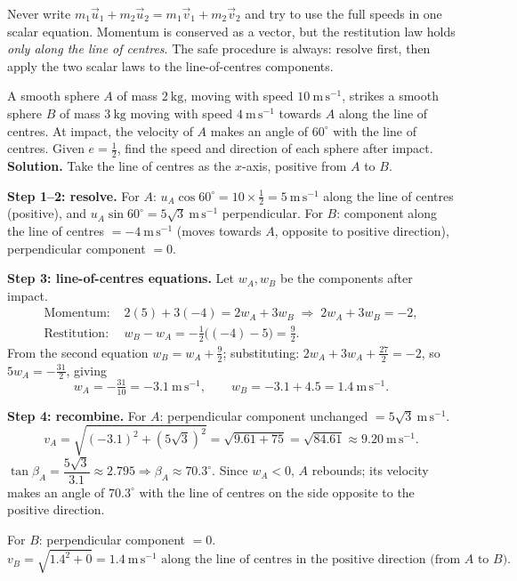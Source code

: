 \documentclass[11pt]{article}
\newcounter{popsec}
\newcounter{popsub}
\newcommand{\courssub}[1]{%
  \stepcounter{popsub}%
  \par\vspace{9pt}\noindent{\popxbold\fontsize{11.5}{13}\selectfont\color{popink}{\color{poporange}\thepopsec.\thepopsub}\hspace{6pt}#1}\par\nopagebreak\vspace{4pt}
}
\begin{document}
\begin{attention}
Never write $m_1\vec{u}_1 + m_2\vec{u}_2 = m_1\vec{v}_1 + m_2\vec{v}_2$ and try to use the full speeds in one scalar equation. Momentum is conserved as a vector, but the restitution law holds \emph{only along the line of centres}. The safe procedure is always: resolve first, then apply the two scalar laws to the line-of-centres components.
\end{attention}

\courssub{Worked Example (GCE Style)}

\begin{exoresolu}
A smooth sphere $A$ of mass $2\ \mathrm{kg}$, moving with speed $10\ \mathrm{m\,s^{-1}}$, strikes a smooth sphere $B$ of mass $3\ \mathrm{kg}$ moving with speed $4\ \mathrm{m\,s^{-1}}$ towards $A$ along the line of centres. At impact, the velocity of $A$ makes an angle of $60^{\circ}$ with the line of centres. Given $e = \tfrac{1}{2}$, find the speed and direction of each sphere after impact.
\tcblower
\textbf{Solution.} Take the line of centres as the $x$-axis, positive from $A$ to $B$.

\textbf{Step 1--2: resolve.} For $A$: $u_A\cos 60^{\circ} = 10 \times \tfrac12 = 5\ \mathrm{m\,s^{-1}}$ along the line of centres (positive), and $u_A\sin 60^{\circ} = 5\sqrt{3}\ \mathrm{m\,s^{-1}}$ perpendicular. For $B$: component along the line of centres $= -4\ \mathrm{m\,s^{-1}}$ (moves towards $A$, opposite to positive direction), perpendicular component $=0$.

\textbf{Step 3: line-of-centres equations.} Let $w_A, w_B$ be the components after impact.
\begin{align*}
\text{Momentum: } & 2(5) + 3(-4) = 2w_A + 3w_B \;\Rightarrow\; 2w_A + 3w_B = -2,\\
\text{Restitution: } & w_B - w_A = -\tfrac12\bigl((-4) - 5\bigr) = \tfrac92.
\end{align*}
From the second equation $w_B = w_A + \tfrac92$; substituting: $2w_A + 3w_A + \tfrac{27}{2} = -2$, so $5w_A = -\tfrac{31}{2}$, giving
\[
w_A = -\tfrac{31}{10} = -3.1\ \mathrm{m\,s^{-1}}, \qquad w_B = -3.1 + 4.5 = 1.4\ \mathrm{m\,s^{-1}}.
\]

\textbf{Step 4: recombine.}
For $A$: perpendicular component unchanged $= 5\sqrt{3}\ \mathrm{m\,s^{-1}}$.
\[
v_A = \sqrt{(-3.1)^2 + (5\sqrt3)^2} = \sqrt{9.61 + 75} = \sqrt{84.61} \approx 9.20\ \mathrm{m\,s^{-1}}.
\]
$\tan\beta_A = \dfrac{5\sqrt3}{3.1} \approx 2.795 \Rightarrow \beta_A \approx 70.3^{\circ}$.
Since $w_A < 0$, $A$ rebounds; its velocity makes an angle of $70.3^{\circ}$ with the line of centres on the side opposite to the positive direction.

For $B$: perpendicular component $= 0$.
\[
v_B = \sqrt{1.4^2 + 0} = 1.4\ \mathrm{m\,s^{-1}} \text{ along the line of centres in the positive direction (from $A$ to $B$).}
\]
\end{exoresolu}
\end{document}
